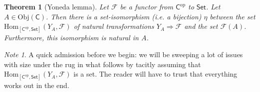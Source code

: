 \documentclass[a4paper,10pt]{scrreprt}
\newcommand{\Obj}{\mathrm{Obj}}
\newcommand{\Hom}{\mathrm{Hom}}
\theoremstyle{definition}
\theoremstyle{plain}
\newtheorem{theorem}{Theorem}[section]
\theoremstyle{remark}
\newtheorem{note}{Note}[section]
\begin{document}
\begin{theorem}[Yoneda lemma]
  Let $\mathcal{F}$ be a functor from $\mathsf{C}^{\mathrm{op}}$ to $\mathsf{Set}$. Let $A \in \Obj(\mathsf{C})$. Then there is a set-isomorphism (i.e. a bijection) $\eta$ between the set $\Hom_{[\mathsf{C}^{\text{op}}, \mathsf{Set}]}(Y_{A}, \mathcal{F})$ of natural transformations $Y_{A} \Rightarrow \mathcal{F}$ and the set $\mathcal{F}(A)$. Furthermore, this isomorphism is natural in $A$.
\end{theorem}
\begin{note}
  A quick admission before we begin: we will be sweeping a lot of issues with size under the rug in what follows by tacitly assuming that $\Hom_{[\mathsf{C}^{\text{op}}, \mathsf{Set}]}(Y_{A}, \mathcal{F})$ is a set. The reader will have to trust that everything works out in the end.
\end{note}
\end{document}
